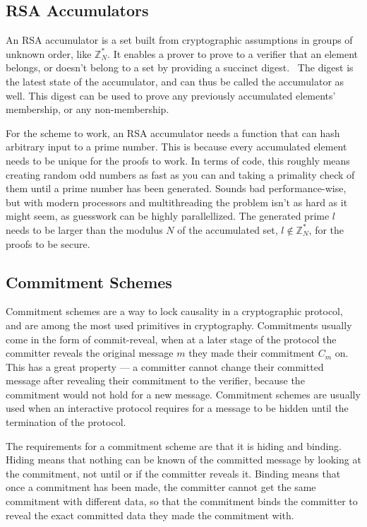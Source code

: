 \subsection{RSA Accumulators}
An RSA accumulator is a set built from cryptographic assumptions in groups of unknown order, like \(\mathbb{Z}^*_N\). It enables a prover to prove to a verifier that an element belongs, or doesn't belong to a set by providing a succinct digest.~\cite{Tomescu2020-wq, Konstantopoulos2019-ls} The digest is the latest state of the accumulator, and can thus be called the accumulator as well. This digest can be used to prove any previously accumulated elements' membership, or any non-membership.

For the scheme to work, an RSA accumulator needs a function that can hash arbitrary input to a prime number. This is because every accumulated element needs to be unique for the proofs to work. In terms of code, this roughly means creating random odd numbers as fast as you can and taking a primality check of them until a prime number has been generated. Sounds bad performance-wise, but with modern processors and multithreading the problem isn't as hard as it might seem, as guesswork can be highly parallellized. The generated prime \(l\) needs to be larger than the modulus \(N\) of the accumulated set, \(l \notin \mathbb{Z}^*_N\), for the proofs to be secure.

\subsection{Commitment Schemes}
Commitment schemes are a way to lock causality in a cryptographic protocol, and are among the most used primitives in cryptography. Commitments usually come in the form of commit-reveal, when at a later stage of the protocol the committer reveals the original message \(m\) they made their commitment \(C_m\) on. This has a great property --- a committer cannot change their committed message after revealing their commitment to the verifier, because the commitment would not hold for a new message. Commitment schemes are usually used when an interactive protocol requires for a message to be hidden until the termination of the protocol.

The requirements for a commitment scheme are that it is hiding and binding. Hiding means that nothing can be known of the committed message by looking at the commitment, not until or if the committer reveals it. Binding means that once a commitment has been made, the committer cannot get the same commitment with different data, so that the commitment binds the committer to reveal the exact committed data they made the commitment with.

